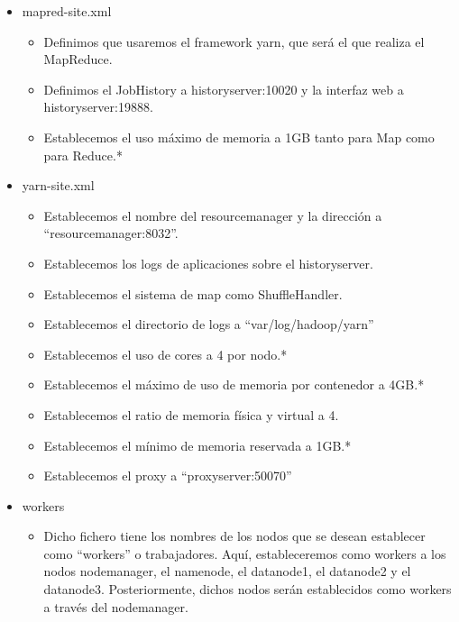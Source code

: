\begin{itemize}
        \item mapred-site.xml
        \begin{itemize}
                \item Definimos que usaremos el framework yarn, que será el que realiza el MapReduce.
                \item Definimos el JobHistory a historyserver:10020 y la interfaz web a historyserver:19888.
                \item Establecemos el uso máximo de memoria a 1GB tanto para Map como para Reduce.*
        \end{itemize}

        \item yarn-site.xml
        \begin{itemize}
                \item Establecemos el nombre del resourcemanager y la dirección a “resourcemanager:8032”.
                \item Establecemos los logs de aplicaciones sobre el historyserver.
                \item Establecemos el sistema de map como ShuffleHandler.
                \item Establecemos el directorio de logs a “var/log/hadoop/yarn”
                \item Establecemos el uso de cores a 4 por nodo.*
                \item Establecemos el máximo de uso de memoria por contenedor a 4GB.*
                \item Establecemos el ratio de memoria física y virtual a 4.
                \item Establecemos el mínimo de memoria reservada a 1GB.*
                \item Establecemos el proxy a “proxyserver:50070”
        \end{itemize}

        \item workers
        \begin{itemize}
                \item Dicho fichero tiene los nombres de los nodos que se desean establecer como “workers” o trabajadores. Aquí, estableceremos como workers a los nodos  nodemanager, el namenode, el datanode1, el datanode2 y el datanode3. Posteriormente, dichos nodos serán establecidos como workers a través del nodemanager.
        \end{itemize}
\end{itemize}

